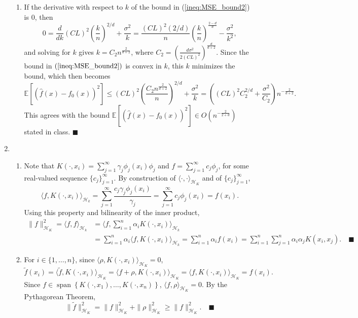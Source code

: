 \documentclass[11pt]{article}
\renewcommand{\qed}{\quad \ensuremath{\blacksquare}}
\newcommand{\vspan}{\operatorname{span}}
\newcommand{\E}{\mathbb{E}} %
\renewcommand{\H}{\mathscr{H}} %
\renewcommand{\hat}{\widehat}
\begin{document}
\begin{enumerate}
\begin{enumerate}
\item If the derivative with respect to $k$ of the bound in
(\ref{ineq:MSE_bound2}) is $0$, then
\[0 = \frac{d}{dk} (CL)^2 \left( \frac{k}{n} \right)^{2/d} + \frac{\sigma^2}{k}
    = \frac{(CL)^2(2/d)}{n}\left( \frac{k}{n} \right)^{\frac{2 - d}{d}}
        - \frac{\sigma^2}{k^2},
\]
and solving for $k$ gives $k = C_2 n^{\frac{2}{d + 2}}$, where
$C_2 = \left( \frac{d\sigma^2}{2(CL)^2} \right)^{\frac{d}{d + 2}}$. Since the
bound in $(\ref{ineq:MSE_bound2})$ is convex in $k$, this $k$ minimizes the
bound, which then becomes
\[\E\left[ \left( \hat f(x) - f_0(x) \right)^2 \right]
    \leq (CL)^2 \left( \frac{C_2n^{\frac{2}{d + 2}}}{n} \right)^{2/d} + \frac{\sigma^2}{k}
    = \left( (CL)^2 C_2^{2/d} + \frac{\sigma^2}{C_2} \right) n^{-\frac{2}{d + 2}}.\]
This agrees with the bound
$\E\left[ \left( \hat f(x) - f_0(x) \right)^2 \right]
    \in O\left( n^{-\frac{2}{2 + d}} \right)$
stated in class. \qed
\end{enumerate}

\newpage
\item
\begin{enumerate}
\item
Note that $K(\cdot, x_i) = \sum_{j = 1}^\infty \gamma_j \phi_j(x_i) \phi_j$ and
$f = \sum_{j = 1}^\infty c_j \phi_j$, for some real-valued sequence
$\{c_j\}_{j = 1}^\infty$. By construction of
$\langle \cdot, \cdot \rangle_{\H_K}$ and of $\{c_j\}_{j = 1}^\infty$,
\[\langle f, K(\cdot, x_i) \rangle_{\H_k}
    = \sum_{j = 1}^\infty \frac{c_j\gamma_j\phi_j(x_i)}{\gamma_j}
    = \sum_{j = 1}^\infty c_j\phi_j(x_i)
    = f(x_i).\]
Using this property and bilinearity of the inner product,
\begin{align*}
\|f\|_{\H_K}^2
    = \langle f, f \rangle_{\H_k}
 &  = \langle f, \sum_{i = 1}^n \alpha_i K(\cdot, x_i) \rangle_{\H_k}   \\
 &  = \sum_{i = 1}^n \alpha_i \langle f, K(\cdot, x_i) \rangle_{\H_k}
    = \sum_{i = 1}^n \alpha_i f(x_i)
    = \sum_{i = 1}^n \sum_{j = 1}^n \alpha_i \alpha_j K(x_i, x_j). \qed
\end{align*}


\item For $i \in \{1,\dots,n\}$, since
$\langle \rho, K(\cdot, x_i) \rangle_{\H_K} = 0$,
\[\tilde f(x_i)
    = \langle \tilde f, K(\cdot, x_i) \rangle_{\H_K}
    = \langle f + \rho, K(\cdot, x_i) \rangle_{\H_K}
    = \langle f, K(\cdot, x_i) \rangle_{\H_K}
    = f(x_i).
\]
Since
$f \in \vspan\left\{ K(\cdot, x_1),\dots,K(\cdot,x_n) \right\}$,
$\langle f, \rho \rangle_{\H_K} = 0$. By the Pythagorean Theorem,
\[\|\tilde f\|_{\H_K}^2
    = \|f\|_{\H_K}^2 + \|\rho\|_{\H_K}^2
    \geq \|f\|_{\H_K}^2. \qed\]


\end{enumerate}
\end{enumerate}
\end{document}
